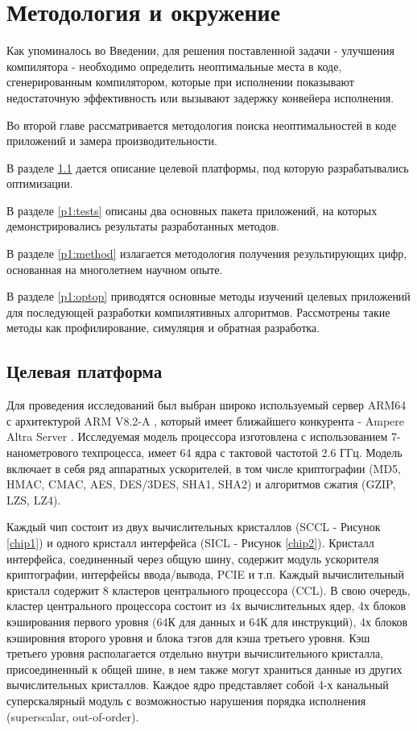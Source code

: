 \chapter{Методология и окружение}\label{ch:chMethod}
Как упоминалось во Введении, для решения поставленной задачи - улучшения компилятора - необходимо определить неоптимальные места в коде, сгенерированным компилятором, которые при исполнении показывают недостаточную эффективность или вызывают задержку конвейера исполнения.

Во второй главе рассматривается методология поиска неоптимальностей в коде приложений и замера производительности. 

В разделе \ref{p1:platform} дается описание целевой платформы, под которую разрабатывались оптимизации.

В разделе  \ref{p1:tests} описаны два основных пакета приложений, на которых демонстрировались результаты разработанных методов.

В разделе \ref{p1:method} излагается методология получения результирующих цифр, основанная на многолетнем научном опыте.

В разделе \ref{p1:optop} приводятся основные методы изучений целевых приложений для последующей разработки компилятивных алгоритмов. Рассмотрены такие методы как профилирование, симуляция и обратная разработка.


\section{Целевая платформа}\label{p1:platform}
Для проведения исследований был выбран широко используемый сервер ARM64 с архитектурой ARM V8.2-A \cite{reid2016trustworthy,xia2021kunpeng}, который имеет ближайшего конкурента - Ampere Altra Server \cite{cha2021ampere}. Исследуемая модель процессора изготовлена с использованием 7-нанометрового техпроцесса, имеет 64 ядра с тактовой частотой 2.6 ГГц. Модель включает в себя  ряд аппаратных ускорителей, в том числе криптографии (MD5, HMAC, CMAC, AES, DES/3DES,  SHA1, SHA2) и  алгоритмов сжатия (GZIP, LZS, LZ4). 

Каждый чип состоит из двух вычислительных кристаллов (SCCL - Рисунок \ref{chip1})  и одного кристалл интерфейса (SICL - Рисунок \ref{chip2}). Кристалл интерфейса, соединенный через общую шину, содержит модуль ускорителя криптографии, интерфейсы ввода/вывода, PCIE и т.п. Каждый вычислительный кристалл содержит 8 кластеров центрального процессора (CCL). В свою очередь, кластер центрального процессора состоит из 4х вычислительных ядер, 4х блоков кэширования первого уровня (64К для данных и 64К для инструкций), 4х блоков кэшировния второго уровня и блока тэгов для кэша третьего уровня. Кэш третьего уровня располагается отдельно внутри вычислительного кристалла, присоединенный к общей шине, в нем также могут храниться данные из других вычислительных кристаллов. Каждое ядро представляет собой 4-х канальный суперскалярный модуль с возможностью нарушения порядка исполнения (superscalar, out-of-order).


